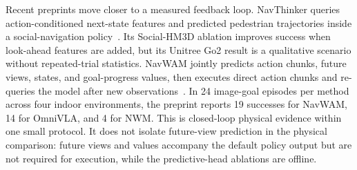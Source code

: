 Recent preprints move closer to a measured feedback loop. NavThinker queries action-conditioned next-state features and predicted pedestrian trajectories inside a social-navigation policy~\cite{hu2026navthinker}. Its Social-HM3D ablation improves success when look-ahead features are added, but its Unitree Go2 result is a qualitative scenario without repeated-trial statistics. NavWAM jointly predicts action chunks, future views, states, and goal-progress values, then executes direct action chunks and re-queries the model after new observations~\cite{azuma2026navwam}. In 24 image-goal episodes per method across four indoor environments, the preprint reports 19 successes for NavWAM, 14 for OmniVLA, and 4 for NWM. This is closed-loop physical evidence within one small protocol. It does not isolate future-view prediction in the physical comparison: future views and values accompany the default policy output but are not required for execution, while the predictive-head ablations are offline.

